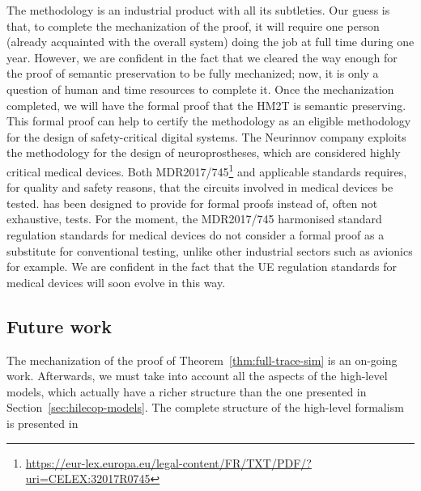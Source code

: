 \documentclass[pdflatex,sn-mathphys]{sn-jnl}%
\theoremstyle{thmstyleone}%
\theoremstyle{thmstyletwo}%
\theoremstyle{thmstylethree}%
\begin{document}
The \hilecop{} methodology is an industrial product with all its
subtleties. Our guess is that, to complete the mechanization of the
proof, it will require one person (already acquainted with the overall
system) doing the job at full time during one year.  However, we are
confident in the fact that we cleared the way enough for the proof of
semantic preservation to be fully mechanized; now, it is only a
question of human and time resources to complete it.  Once the
mechanization completed, we will have the formal proof that the HM2T
is semantic preserving. This formal proof can help to certify the
\hilecop{} methodology as an eligible methodology for the design of
safety-critical digital systems.  The Neurinnov company exploits the
\hilecop{} methodology for the design of neuroprostheses, which are
considered highly critical medical devices. %
Both
MDR2017/745\footnote{\url{https://eur-lex.europa.eu/legal-content/FR/TXT/PDF/?uri=CELEX:32017R0745}}
and applicable standards requires, for quality and safety reasons,
that the circuits involved in medical devices be tested. \hilecop{}
has been designed to provide for formal proofs instead of, often not
exhaustive, tests.  For the moment, the MDR2017/745 harmonised
standard regulation standards for medical devices do not consider a
formal proof as a substitute for conventional testing, unlike other
industrial sectors such as avionics for example. We are confident in
the fact that the UE regulation standards for medical devices will
soon evolve in this way.


\subsection{Future work}
\label{sec:future}

The mechanization of the proof of Theorem~\ref{thm:full-trace-sim} is
an on-going work.  Afterwards, we must take into account all the
aspects of the \hilecop{} high-level models, which actually have a
richer structure than the one presented in
Section~\ref{sec:hilecop-models}. The complete structure of the
high-level formalism is presented in 

\end{document}
